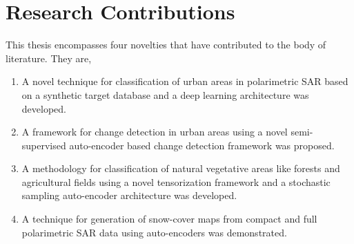 \documentclass[12pt, a4paper]{article}
\begin{document}
\section{Research Contributions}

This thesis encompasses four novelties that have contributed to the body of literature. They are, 
\begin{enumerate}
	\item A novel technique for classification of urban areas in polarimetric SAR based on a synthetic target database and a deep learning architecture was developed.
	\item A framework for change detection in urban areas using a novel semi-supervised auto-encoder based change detection framework was proposed.
	\item A methodology for classification of natural vegetative areas like forests and agricultural fields using a novel tensorization framework and a stochastic sampling auto-encoder architecture was developed. 
	\item A technique for generation of snow-cover maps from compact and full polarimetric SAR data using auto-encoders was demonstrated. 
\end{enumerate}


\clearpage

{\footnotesize \singlespacing
}


\end{document}
